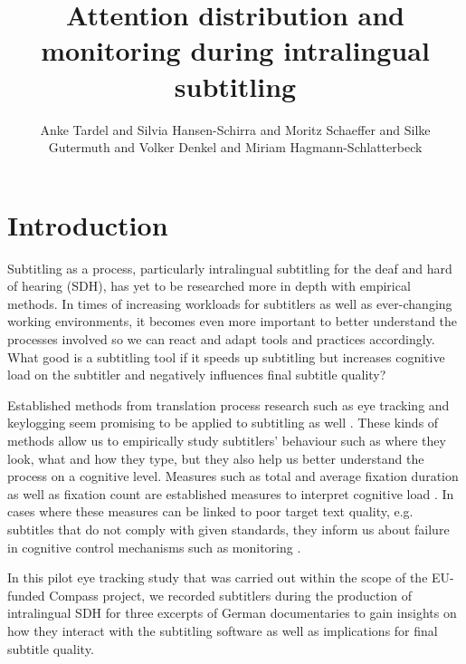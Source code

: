 \documentclass[output=paper]{langscibook}
\author{Anke Tardel\affiliation{University of Mainz} and Silvia Hansen-Schirra\affiliation{University of Mainz} and Moritz Schaeffer\affiliation{University of Mainz} and Silke Gutermuth\affiliation{University of Mainz} and Volker Denkel\affiliation{ZDF Digital} and Miriam Hagmann-Schlatterbeck\affiliation{ZDF Digital}}
\title{Attention distribution and monitoring during intralingual subtitling}
\begin{document}
\renewcommand{\lsChapterFooterSize}{\scriptsize}
\maketitle

\section{Introduction} 
Subtitling as a process, particularly intralingual subtitling for the deaf and hard of hearing (SDH), has yet to be researched more in depth with empirical methods.
In times of increasing workloads for subtitlers as well as ever-changing working environments, it becomes even more important to better understand the processes involved so we can react and adapt tools and practices accordingly.
What good is a subtitling tool if it speeds up subtitling but increases cognitive load on the subtitler and negatively influences final subtitle quality?

Established methods from translation process research such as eye tracking and keylogging seem promising to be applied to subtitling as well \citep{orrego2018using}.
These kinds of methods allow us to empirically study subtitlers' behaviour such as where they look, what and how they type, but they also help us better understand the process on a cognitive level.
Measures such as total and average fixation duration as well as fixation count are established measures to interpret cognitive load \citep{buettner2013}.
In cases where these measures can be linked to poor target text quality, e.g.
subtitles that do not comply with given standards, they inform us about failure in cognitive control mechanisms such as monitoring \citep{schaeffer-etal2019}.

In this pilot eye tracking study that was carried out within the scope of the EU-funded Compass project, we recorded subtitlers during the production of intralingual SDH for three excerpts of German documentaries to gain insights on how they interact with the subtitling software as well as implications for final subtitle quality.
\end{document}
